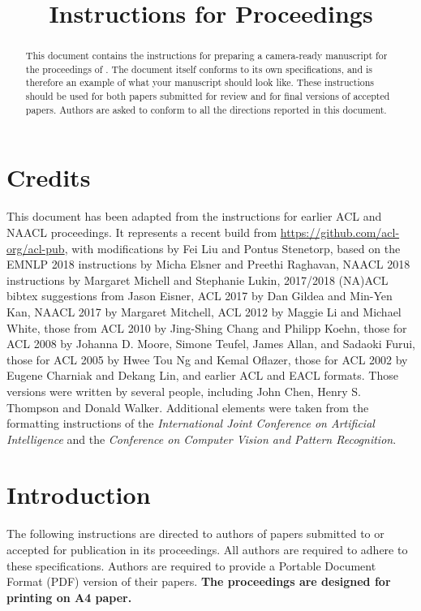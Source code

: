 \title{Instructions for Proceedings}

\begin{abstract}
This document contains the instructions for preparing a camera-ready manuscript for the proceedings of \confname{}. The document itself conforms to its own specifications, and is therefore an example of what your manuscript should look like. These instructions should be used for both papers submitted for review and for final versions of accepted papers.  Authors are asked to conform to all the directions reported in this document.
\end{abstract}

\section{Credits}

This document has been adapted from the instructions for earlier ACL and NAACL proceedings. It represents a recent build from
\url{https://github.com/acl-org/acl-pub}, with modifications by Fei Liu and Pontus Stenetorp, based on the EMNLP 2018 instructions by Micha Elsner and Preethi Raghavan, NAACL 2018 instructions by Margaret Michell and Stephanie Lukin, 2017/2018 (NA)ACL bibtex suggestions from Jason Eisner, ACL 2017 by Dan Gildea and Min-Yen Kan, NAACL 2017 by Margaret Mitchell, ACL 2012 by Maggie Li and Michael White, those from ACL 2010 by Jing-Shing Chang and Philipp Koehn, those for ACL 2008 by Johanna D. Moore, Simone Teufel, James Allan, and Sadaoki Furui, those for ACL 2005 by Hwee Tou Ng and Kemal Oflazer, those for ACL 2002 by Eugene Charniak and Dekang Lin, and earlier ACL and EACL formats.  Those versions were written by several people, including John Chen, Henry S. Thompson and Donald Walker. Additional elements were taken from the formatting instructions of the {\em International Joint Conference on Artificial Intelligence} and the \emph{Conference on Computer Vision and Pattern Recognition}.

\section{Introduction}

The following instructions are directed to authors of papers submitted to \confname{} or accepted for publication in its proceedings. All authors are required to adhere to these specifications. Authors are required to provide a Portable Document Format (PDF) version of their papers. \textbf{The proceedings are designed for printing on A4 paper.}

